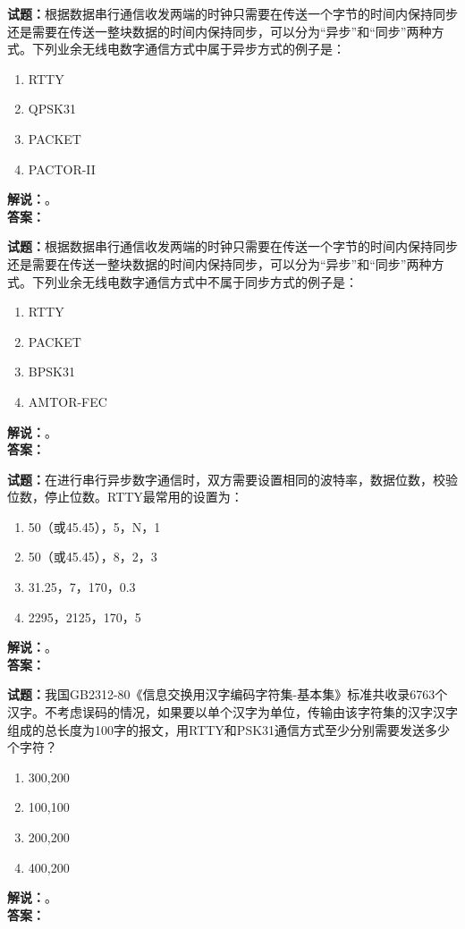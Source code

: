 \documentclass{ctexbook}
\begin{document}
\noindent\textbf{试题：}根据数据串行通信收发两端的时钟只需要在传送一个字节的时间内保持同步还是需要在传送一整块数据的时间内保持同步，可以分为“异步”和“同步”两种方式。下列业余无线电数字通信方式中属于异步方式的例子是：
\begin{enumerate}[leftmargin=3em]
\item RTTY
\item QPSK31
\item PACKET
\item PACTOR-II
\end{enumerate}
\noindent\textbf{解说：}\textbf{}。\\\noindent\textbf{答案：}

\bigskip




\noindent\textbf{试题：}根据数据串行通信收发两端的时钟只需要在传送一个字节的时间内保持同步还是需要在传送一整块数据的时间内保持同步，可以分为“异步”和“同步”两种方式。下列业余无线电数字通信方式中不属于同步方式的例子是：
\begin{enumerate}[leftmargin=3em]
\item RTTY
\item PACKET
\item BPSK31
\item AMTOR-FEC
\end{enumerate}
\noindent\textbf{解说：}\textbf{}。\\\noindent\textbf{答案：}

\bigskip




\noindent\textbf{试题：}在进行串行异步数字通信时，双方需要设置相同的波特率，数据位数，校验位数，停止位数。RTTY最常用的设置为：
\begin{enumerate}[leftmargin=3em]
\item 50（或45.45），5，N，1
\item 50（或45.45），8，2，3
\item 31.25，7，170，0.3
\item 2295，2125，170，5
\end{enumerate}
\noindent\textbf{解说：}\textbf{}。\\\noindent\textbf{答案：}

\bigskip




\noindent\textbf{试题：}我国GB2312-80《信息交换用汉字编码字符集-基本集》标准共收录6763个汉字。不考虑误码的情况，如果要以单个汉字为单位，传输由该字符集的汉字汉字组成的总长度为100字的报文，用RTTY和PSK31通信方式至少分别需要发送多少个字符？
\begin{enumerate}[leftmargin=3em]
\item 300,200
\item 100,100
\item 200,200
\item 400,200
\end{enumerate}
\noindent\textbf{解说：}\textbf{}。\\\noindent\textbf{答案：}
\end{document}
